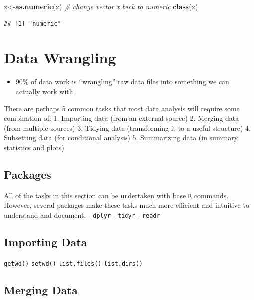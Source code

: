 \documentclass[]{book}
\newenvironment{Shaded}{\begin{snugshade}}{\end{snugshade}}
\newcommand{\KeywordTok}[1]{\textcolor[rgb]{0.13,0.29,0.53}{\textbf{#1}}}
\newcommand{\CommentTok}[1]{\textcolor[rgb]{0.56,0.35,0.01}{\textit{#1}}}
\newcommand{\NormalTok}[1]{#1}
\providecommand{\tightlist}{%
  \setlength{\itemsep}{0pt}\setlength{\parskip}{0pt}}
\theoremstyle{definition}
\theoremstyle{definition}
\theoremstyle{definition}
\theoremstyle{remark}
\begin{document}
\begin{Shaded}
\begin{Highlighting}[]
\NormalTok{x<-}\KeywordTok{as.numeric}\NormalTok{(x) }\CommentTok{# change vector x back to numeric }
\KeywordTok{class}\NormalTok{(x)}
\end{Highlighting}
\end{Shaded}

\begin{verbatim}
## [1] "numeric"
\end{verbatim}

\chapter*{Data Wrangling}\label{data-wrangling}

\begin{itemize}
\tightlist
\item
  90\% of data work is ``wrangling'' raw data files into something we
  can actually work with
\end{itemize}

There are perhaps 5 common tasks that most data analysis will require
some combination of: 1. Importing data (from an external source) 2.
Merging data (from multiple sources) 3. Tidying data (transforming it to
a useful structure) 4. Subsetting data (for conditional analysis) 5.
Summarizing data (in summary statistics and plots)

\section{Packages}\label{packages-1}

All of the tasks in this section can be undertaken with base \texttt{R}
commands. However, several packages make these tasks much more efficient
and intuitive to understand and document. - \texttt{dplyr} -
\texttt{tidyr} - \texttt{readr}

\section{Importing Data}\label{importing-data}

\texttt{getwd()} \texttt{setwd()} \texttt{list.files()}
\texttt{list.dirs()}

\section{Merging Data}\label{merging-data}
\end{document}
